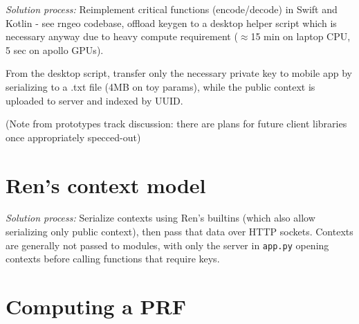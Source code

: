 \documentclass{article}
\begin{document}
\noindent{}
\vspace{0.3cm}

\textit{Solution process:} Reimplement critical functions (encode/decode) in Swift and Kotlin - see rngeo codebase, offload keygen to a desktop helper script which is necessary anyway due to heavy compute requirement ($\approx$15 min on laptop CPU, 5 sec on apollo GPUs).

From the desktop script, transfer only the necessary private key to mobile app by serializing to a .txt file (4MB on toy params), while the public context is uploaded to server and indexed by UUID.

(Note from prototypes track discussion: there are plans for future client libraries once appropriately specced-out)

\section{Ren's context model}

\noindent{}
\vspace{0.3cm}

\textit{Solution process:} Serialize contexts using Ren's builtins (which also allow serializing only public context), then pass that data over HTTP sockets.
Contexts are generally not passed to modules, with only the server in \verb|app.py| opening contexts before calling functions that require keys.

\section{Computing a PRF}
\end{document}
